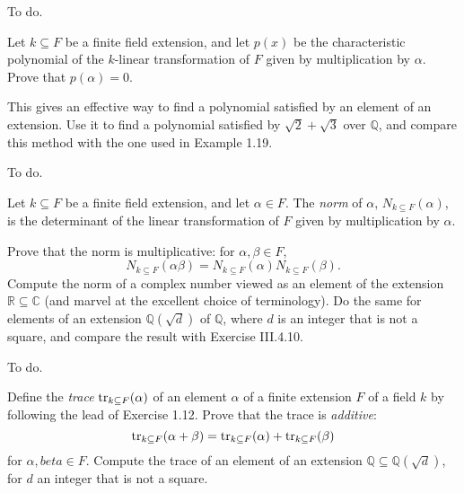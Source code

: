 \documentclass[../../master.tex]{subfiles}
\begin{document}
\begin{solution}
    To do.
\end{solution}

\begin{problem}
    Let $k \subseteq F$ be a finite field extension, and let $p(x)$ be the characteristic polynomial of the $k$-linear transformation of $F$ given by multiplication by $\alpha$.
    Prove that $p(\alpha) = 0$.

    This gives an effective way to find a polynomial satisfied by an element of an extension.
    Use it to find a polynomial satisfied by $\sqrt{2} + \sqrt{3}$ over $\mathbb{Q}$, and compare this method with the one used in Example 1.19.
\end{problem}

\begin{solution}
    To do.
\end{solution}

\begin{problem}
    Let $k \subseteq F$ be a finite field extension, and let $\alpha \in F$.
    The \textit{norm} of $\alpha$, $N_{k \subseteq F}(\alpha)$, is the determinant of the linear transformation of $F$ given by multiplication by $\alpha$.

    Prove that the norm is multiplicative: for $\alpha, \beta \in F$,
    \[
        N_{k \subseteq F} (\alpha \beta) = N_{k \subseteq F} (\alpha) N_{k \subseteq F} (\beta).
    \]
    Compute the norm of a complex number viewed as an element of the extension $\mathbb{R} \subseteq \mathbb{C}$ (and marvel at the excellent choice of terminology).
    Do the same for elements of an extension $\mathbb{Q}(\sqrt{d})$ of $\mathbb{Q}$, where $d$ is an integer that is not a square, and compare the result with Exercise III.4.10.
\end{problem}

\begin{solution}
    To do.
\end{solution}

\begin{problem}
    Define the \textit{trace} $\operatorname{tr}_{k \subseteq F}(\alpha)$ of an element $\alpha$ of a finite extension $F$ of a field $k$ by following the lead of Exercise 1.12.
    Prove that the trace is \textit{additive}:
    \[
        \operatorname{tr}_{k \subseteq F}(\alpha + \beta) = \operatorname{tr}_{k \subseteq F}(\alpha) + \operatorname{tr}_{k \subseteq F}(\beta)
    \]
    for $\alpha, beta \in F$.
    Compute the trace of an element of an extension $\mathbb{Q} \subseteq \mathbb{Q}(\sqrt{d})$, for $d$ an integer that is not a square.
\end{problem}
\end{document}
